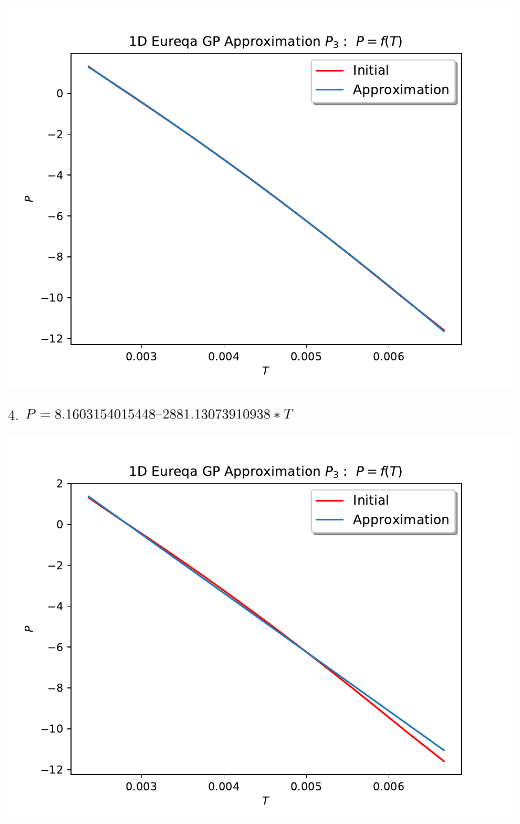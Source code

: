 \documentclass[english,12pt,a4paper]{article}
\theoremstyle{definition}
\begin{document}
\includegraphics[scale=0.7]{Test1DEqP3}

\vspace{0.5cm}

4. $P=8.1603154015448\text{\textendash}2881.13073910938*T$

\includegraphics[scale=0.7]{Test1DEqP4}
\end{document}
